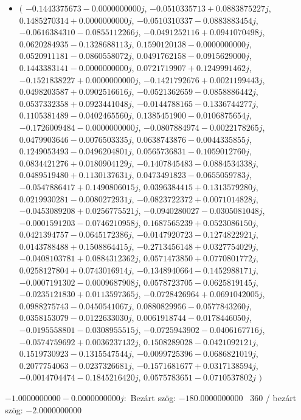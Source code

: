 \documentclass[14pt,a4paper]{article}
\begin{document}
\begin{itemize}
\item
$\big($
$-0.1443375673-0.0000000000j$, $-0.0510335713+0.0883875227j$, $0.1485270314+0.0000000000j$, $-0.0510310337-0.0883883454j$, $-0.0616384310-0.0855112266j$, $-0.0491252116+0.0941070498j$, $0.0620284935-0.1328688113j$, $0.1590120138-0.0000000000j$, $0.0520911181-0.0860558072j$, $0.0491762158-0.0915629000j$, $0.1443383141-0.0000000000j$, $0.0721719907+0.1249991462j$, $-0.1521838227+0.0000000000j$, $-0.1421792676+0.0021199443j$, $0.0498203587+0.0902516616j$, $-0.0521362659-0.0858886442j$, $0.0537332358+0.0923441048j$, $-0.0144788165-0.1336744277j$, $0.1105381489-0.0402465560j$, $0.1385451900-0.0106875654j$, $-0.1726009484-0.0000000000j$, $-0.0807884974-0.0022178265j$, $0.0479903646-0.0076503335j$, $0.0638743876-0.0044335855j$, $0.1249053493-0.0496204801j$, $0.0565736831-0.1059012760j$, $0.0834421276+0.0180904129j$, $-0.1407845483-0.0884534338j$, $0.0489519480+0.1130137631j$, $0.0473491823-0.0655059783j$, $-0.0547886417+0.1490806015j$, $0.0396384415+0.1313579280j$, $0.0219930281-0.0080272931j$, $-0.0823722372+0.0071014828j$, $-0.0453089208+0.0256775521j$, $-0.0940280027-0.0305081048j$, $-0.0001591203-0.0746210958j$, $0.1687565239+0.0523086150j$, $0.0421394757-0.0645172386j$, $-0.0147920723-0.1274822921j$, $0.0143788488+0.1508864415j$, $-0.2713456148+0.0327754029j$, $-0.0408103781+0.0884312362j$, $0.0571473850+0.0770801772j$, $0.0258127804+0.0743016914j$, $-0.1348940664-0.1452988171j$, $-0.0007191302-0.0009687908j$, $0.0578723705-0.0625819145j$, $-0.0235121830+0.0113597365j$, $-0.0728426964+0.0691042005j$, $0.0988275743-0.0450541067j$, $0.0880829956-0.0577843260j$, $0.0358153079-0.0122633030j$, $0.0061918744-0.0178446050j$, $-0.0195558801-0.0308955515j$, $-0.0725943902-0.0406167716j$, $-0.0574759692+0.0036237132j$, $0.1508289028-0.0421092121j$, $0.1519730923-0.1315547544j$, $-0.0099725396-0.0686821019j$, $0.2077754063-0.0237326681j$, $-0.1571681677+0.0317138594j$, $-0.0014704474-0.1845216420j$, $0.0575783651-0.0710537802j$
$\big)$
\end{itemize}
$-1.0000000000-0.0000000000j$:\
Bezárt szög: $-180.0000000000$ \
360 / bezárt szög: $-2.0000000000$\
\end{document}
